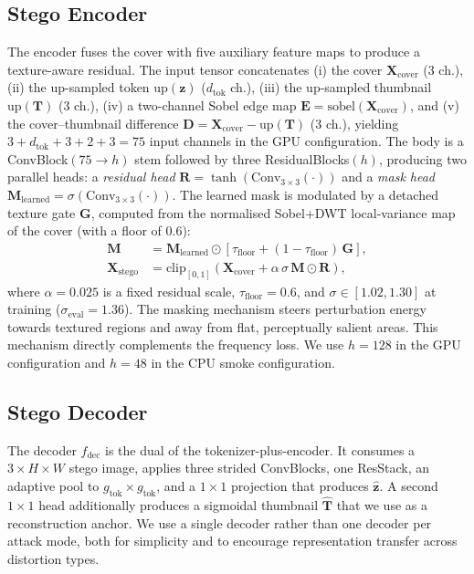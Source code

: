 \documentclass[runningheads]{llncs}
\begin{document}
\subsection{Stego Encoder}
\label{sec:enc}
The encoder fuses the cover with five auxiliary feature maps to produce a texture-aware residual. The input tensor concatenates (i) the cover $\mathbf{X}_{\text{cover}}$ ($3$ ch.), (ii) the up-sampled token $\mathrm{up}(\mathbf{z})$ ($d_{\text{tok}}$ ch.), (iii) the up-sampled thumbnail $\mathrm{up}(\mathbf{T})$ ($3$ ch.), (iv) a two-channel Sobel edge map $\mathbf{E}=\mathrm{sobel}(\mathbf{X}_{\text{cover}})$, and (v) the cover--thumbnail difference $\mathbf{D}=\mathbf{X}_{\text{cover}}-\mathrm{up}(\mathbf{T})$ ($3$ ch.), yielding $3{+}d_{\text{tok}}{+}3{+}2{+}3=75$ input channels in the GPU configuration. The body is a ConvBlock$(75\!\to\!h)$ stem followed by three ResidualBlocks$(h)$, producing two parallel heads: a \emph{residual head} $\mathbf{R}=\tanh(\text{Conv}_{3\times3}(\cdot))$ and a \emph{mask head} $\mathbf{M}_{\text{learned}}=\sigma(\text{Conv}_{3\times3}(\cdot))$. The learned mask is modulated by a detached texture gate $\mathbf{G}$, computed from the normalised Sobel+DWT local-variance map of the cover (with a floor of $0.6$):
\begin{align}
    \mathbf{M} &= \mathbf{M}_{\text{learned}} \odot \left[\tau_{\text{floor}} + (1-\tau_{\text{floor}})\,\mathbf{G}\right], \label{eq:mask}\\
    \mathbf{X}_{\text{stego}} &= \mathrm{clip}_{[0,1]}\!\left(\mathbf{X}_{\text{cover}}+\alpha\,\sigma\,\mathbf{M}\odot\mathbf{R}\right),
    \label{eq:stego}
\end{align}
where $\alpha\!=\!0.025$ is a fixed residual scale, $\tau_{\text{floor}}\!=\!0.6$, and $\sigma\!\in\![1.02,1.30]$ at training ($\sigma_{\text{eval}}\!=\!1.36$). The masking mechanism steers perturbation energy towards textured regions and away from flat, perceptually salient areas. This mechanism directly complements the frequency loss. We use $h\!=\!128$ in the GPU configuration and $h\!=\!48$ in the CPU smoke configuration.

\subsection{Stego Decoder}
\label{sec:dec}
The decoder $f_{\text{dec}}$ is the dual of the tokenizer-plus-encoder. It consumes a $3\!\times\!H\!\times\!W$ stego image, applies three strided ConvBlocks, one ResStack, an adaptive pool to $g_{\text{tok}}\!\times\!g_{\text{tok}}$, and a $1\!\times\!1$ projection that produces $\hat{\mathbf{z}}$. A second $1\!\times\!1$ head additionally produces a sigmoidal thumbnail $\hat{\mathbf{T}}$ that we use as a reconstruction anchor. We use a single decoder rather than one decoder per attack mode, both for simplicity and to encourage representation transfer across distortion types.
\end{document}
